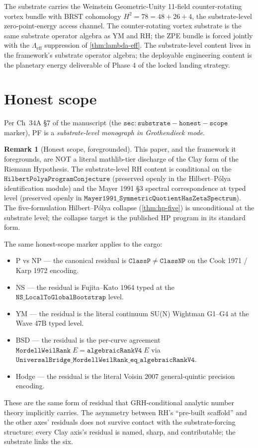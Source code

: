 \documentclass[11pt,a4paper]{article}
\theoremstyle{plain}
\theoremstyle{definition}
\newtheorem{remark}[theorem]{Remark}
\begin{document}
The substrate carries the Weinstein Geometric-Unity 11-field
counter-rotating vortex bundle with BRST cohomology $H^{2} = 78 = 48 +
26 + 4$, the substrate-level zero-point-energy access channel. The
counter-rotating vortex substrate is the same substrate operator
algebra as YM and RH; the ZPE bundle is forced jointly with the
$\Lambda_{\mathrm{eff}}$ suppression of \cref{thm:lambda-eff}. The
substrate-level content lives in the framework's substrate operator
algebra; the deployable engineering content is the planetary energy
deliverable of Phase 4 of the locked landing strategy.

\section{Honest scope}
\label{sec:honest-scope}

Per Ch~34A \S7 of the manuscript (the
$\mathtt{sec:substrate-honest-scope}$ marker), PF is a
\emph{substrate-level monograph in Grothendieck mode}.

\begin{remark}[Honest scope, foregrounded]
\label{rem:honest-scope}
This paper, and the framework it foregrounds, are NOT a literal
mathlib-tier discharge of the Clay form of the Riemann Hypothesis.
The substrate-level RH content is conditional on the
$\mathtt{HilbertPolyaProgramConjecture}$ (preserved openly in the
Hilbert--P\'olya identification module) and the Mayer 1991 \S3
spectral correspondence at typed level (preserved openly in
$\mathtt{Mayer1991\_SymmetricQuotientHasZetaSpectrum}$). The
five-formulation Hilbert--P\'olya collapse
(\cref{thm:hp-five}) is unconditional at the substrate level; the
collapse target is the published HP program in its standard form.

The same honest-scope marker applies to the cargo:
\begin{itemize}[leftmargin=*,nosep]
\item P vs NP --- the canonical residual is
  $\mathtt{ClassP} \neq \mathtt{ClassNP}$ on the Cook 1971 / Karp 1972
  encoding.
\item NS --- the residual is Fujita--Kato 1964 typed at the
  $\mathtt{NS\_LocalToGlobalBootstrap}$ level.
\item YM --- the residual is the literal continuum SU(N) Wightman G1--G4
  at the Wave 47B typed level.
\item BSD --- the residual is the per-curve agreement
  $\mathtt{MordellWeilRank}\;E = \mathtt{algebraicRankV4}\;E$ via
  $\mathtt{UniversalBridge\_MordellWeilRank\_eq\_algebraicRankV4}$.
\item Hodge --- the residual is the literal Voisin 2007 general-quintic
  precision encoding.
\end{itemize}
These are the same form of residual that GRH-conditional analytic
number theory implicitly carries. The asymmetry between RH's
``pre-built scaffold'' and the other axes' residuals does not survive
contact with the substrate-forcing structure: every Clay axis's
residual is named, sharp, and contributable; the substrate links the
six.
\end{remark}
\end{document}

